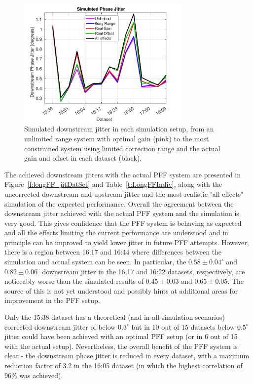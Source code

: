 \begin{figure}
  \centering
  \includegraphics[width=0.75\textwidth]{Figures/feedforward/longFF_datSetJitSim}
  \caption{Simulated downstream jitter in each simulation setup, from an unlimited range system with optimal gain (pink) to the most constrained system using limited correction range and the actual gain and offset in each dataset (black).}
  \label{f:longFF_datSetJitSim}
\end{figure}

The achieved downstream jitters with the actual PFF system are presented in Figure~\ref{f:longFF_jitDatSet} and Table~\ref{t:LongFFIndiv}, along with the uncorrected downstream and upstream jitter and the most realistic "all effects" simulation of the expected performance. Overall the agreement between the downstream jitter achieved with the actual PFF system and the simulation is very good. This gives confidence that the PFF system is behaving as expected and all the effects limiting the current performance are understood and in principle can be improved to yield lower jitter in future PFF attempts. However, there is a region between 16:17 and 16:44 where differences between the simulation and actual system can be seen. In particular, the \(0.58\pm0.04^\circ\) and \(0.82\pm0.06^\circ\) downstream jitter in the 16:17 and 16:22 datasets, respectively, are noticeably worse than the simulated results of \(0.45\pm0.03\) and \(0.65\pm0.05\). The source of this is not yet understood and possibly hints at additional areas for improvement in the PFF setup.

Only the 15:38 dataset has a theoretical (and in all simulation scenarios) corrected downstream jitter of below \(0.3^\circ\) but in 10 out of 15 datasets below \(0.5^\circ\) jitter could have been achieved with an optimal PFF setup (or in 6 out of 15 with the actual setup). Nevertheless, 
the overall benefit of the PFF system is clear - the downstream phase jitter is reduced in every dataset, with a maximum reduction factor of 3.2 in the 16:05 dataset (in which the highest correlation of 96\% was achieved).

